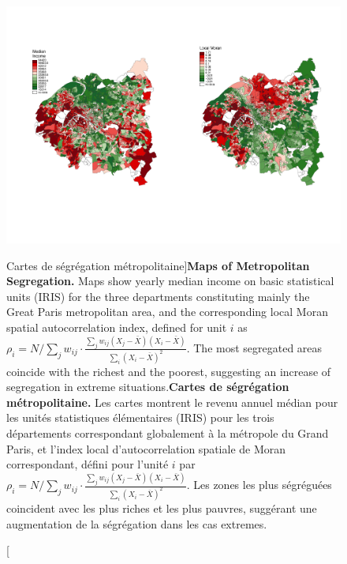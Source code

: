 \begin{figure}[h!]
\centering
\hspace{-3cm}\includegraphics[width=1.2\textwidth]{Figures/RobustnessDiscrepancy/grandParis_income_moran.pdf}\hspace{-2cm}
\vspace{-2.5cm}
\caption[Maps of Metropolitan Segregation][Cartes de ségrégation métropolitaine]{\textbf{Maps of Metropolitan Segregation.} Maps show yearly median income on basic statistical units (IRIS) for the three departments constituting mainly the Great Paris metropolitan area, and the corresponding local Moran spatial autocorrelation index, defined for unit $i$ as $\rho_i = N/\sum_{j}w_{ij} \cdot \frac{\sum_{j} w_{ij} (X_j - \bar{X})(X_i - \bar{X})}{\sum_i (X_i - \bar{X})^2}$. The most segregated areas coincide with the richest and the poorest, suggesting an increase of segregation in extreme situations.}{\textbf{Cartes de ségrégation métropolitaine.} Les cartes montrent le revenu annuel médian pour les unités statistiques élémentaires (IRIS) pour les trois départements correspondant globalement à la métropole du Grand Paris, et l'index local d'autocorrelation spatiale de Moran correspondant, défini pour l'unité $i$ par $\rho_i = N/\sum_{j}w_{ij} \cdot \frac{\sum_{j} w_{ij} (X_j - \bar{X})(X_i - \bar{X})}{\sum_i (X_i - \bar{X})^2}$. Les zones les plus ségréguées coincident avec les plus riches et les plus pauvres, suggérant une augmentation de la ségrégation dans les cas extremes.}
\label{fig:robustness:segreg}
\end{figure}


